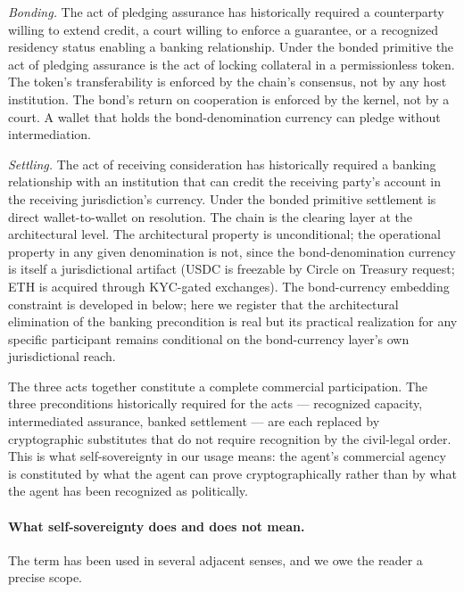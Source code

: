 \documentclass[11pt,a4paper]{article}
\theoremstyle{remark}
\begin{document}
\emph{Bonding.} The act of pledging assurance has historically
required a counterparty willing to extend credit, a court willing
to enforce a guarantee, or a recognized residency status enabling
a banking relationship. Under the bonded primitive the act of
pledging assurance is the act of locking collateral in a
permissionless token. The token's transferability is enforced by
the chain's consensus, not by any host institution. The bond's
return on cooperation is enforced by the kernel, not by a court.
A wallet that holds the bond-denomination currency can pledge
without intermediation.

\emph{Settling.} The act of receiving consideration has
historically required a banking relationship with an institution
that can credit the receiving party's account in the receiving
jurisdiction's currency. Under the bonded primitive settlement
is direct wallet-to-wallet on resolution. The chain is the
clearing layer at the architectural level. The architectural
property is unconditional; the operational property in any given
denomination is not, since the bond-denomination currency is
itself a jurisdictional artifact (USDC is freezable by Circle on
Treasury request; ETH is acquired through KYC-gated exchanges).
The bond-currency embedding constraint is developed in
 below; here we register that the
architectural elimination of the banking precondition is real
but its practical realization for any specific participant
remains conditional on the bond-currency layer's own
jurisdictional reach.

The three acts together constitute a complete commercial
participation. The three preconditions historically required for
the acts --- recognized capacity, intermediated assurance,
banked settlement --- are each replaced by cryptographic
substitutes that do not require recognition by the civil-legal
order. This is what self-sovereignty in our usage means: the
agent's commercial agency is constituted by what the agent can
prove cryptographically rather than by what the agent has been
recognized as politically.

\paragraph{What self-sovereignty does and does not mean.}
The term has been used in several adjacent senses, and we owe
the reader a precise scope.
\end{document}
